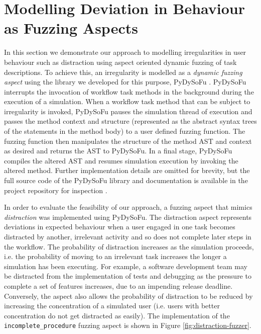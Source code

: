 \documentclass{llncs}
\begin{document}

\section{Modelling Deviation in Behaviour as Fuzzing Aspects}
\label{sec:fuzzing}


In this section we demonstrate our approach to modelling irregularities in user behaviour such as distraction using
aspect oriented dynamic fuzzing of task descriptions.  To achieve this, an irregularity is modelled as a \emph{dynamic
  fuzzing aspect} using the library we developed for this purpose, PyDySoFu \cite{storer2016pydysofu-scm}.  PyDySoFu
interrupts the invocation of workflow task methods in the background during the execution of a simulation.  When a
workflow task method that can be subject to irregularity is invoked, PyDySoFu pauses the simulation thread of execution
and passes the method context and structure (represented as the abstract syntax trees of the statements in the method
body) to a user defined fuzzing function.  The fuzzing function then manipulates the structure of the method AST and
context as desired and returns the AST to PyDySoFu.  In a final stage, PyDySoFu compiles the altered AST and resumes
simulation execution by invoking the altered method.  Further implementation details are omitted for brevity, but the
full source code of the PyDySoFu library and documentation is available in the project repository for inspection
\cite{storer2016pydysofu-scm}.

In order to evaluate the feasibility of our approach, a fuzzing aspect that mimics \emph{distraction} was implemented
using PyDySoFu.  The distraction aspect represents deviations in expected behaviour when a user engaged in one task
becomes distracted by another, irrelevant activity and so does not complete later steps in the workflow.  The
probability of distraction increases as the simulation proceeds, i.e. the probability of moving to an irrelevant task
increases the longer a simulation has been executing.  For example, a software development team may be distracted from
the implementation of tests and debugging as the pressure to complete a set of features increases, due to an impending
release deadline.  Conversely, the aspect also allows the probability of distraction to be reduced by increasing the
concentration of a simulated user (i.e. users with better concentration do not get distracted as easily).
The implementation of the \lstinline!incomplete_procedure! fuzzing aspect is shown in Figure
\ref{fig:distraction-fuzzer}.
\end{document}
